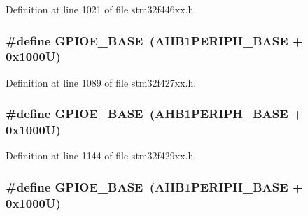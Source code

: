 Definition at line 1021 of file stm32f446xx.\+h.

\subsubsection[{\texorpdfstring{G\+P\+I\+O\+E\+\_\+\+B\+A\+SE}{GPIOE_BASE}}]{\setlength{\rightskip}{0pt plus 5cm}\#define G\+P\+I\+O\+E\+\_\+\+B\+A\+SE~({\bf A\+H\+B1\+P\+E\+R\+I\+P\+H\+\_\+\+B\+A\+SE} + 0x1000\+U)}\hypertarget{group___peripheral__memory__map_gab487b1983d936c4fee3e9e88b95aad9d}{}\label{group___peripheral__memory__map_gab487b1983d936c4fee3e9e88b95aad9d}


Definition at line 1089 of file stm32f427xx.\+h.

\subsubsection[{\texorpdfstring{G\+P\+I\+O\+E\+\_\+\+B\+A\+SE}{GPIOE_BASE}}]{\setlength{\rightskip}{0pt plus 5cm}\#define G\+P\+I\+O\+E\+\_\+\+B\+A\+SE~({\bf A\+H\+B1\+P\+E\+R\+I\+P\+H\+\_\+\+B\+A\+SE} + 0x1000\+U)}\hypertarget{group___peripheral__memory__map_gab487b1983d936c4fee3e9e88b95aad9d}{}\label{group___peripheral__memory__map_gab487b1983d936c4fee3e9e88b95aad9d}


Definition at line 1144 of file stm32f429xx.\+h.

\subsubsection[{\texorpdfstring{G\+P\+I\+O\+E\+\_\+\+B\+A\+SE}{GPIOE_BASE}}]{\setlength{\rightskip}{0pt plus 5cm}\#define G\+P\+I\+O\+E\+\_\+\+B\+A\+SE~({\bf A\+H\+B1\+P\+E\+R\+I\+P\+H\+\_\+\+B\+A\+SE} + 0x1000\+U)}\hypertarget{group___peripheral__memory__map_gab487b1983d936c4fee3e9e88b95aad9d}{}\label{group___peripheral__memory__map_gab487b1983d936c4fee3e9e88b95aad9d}


